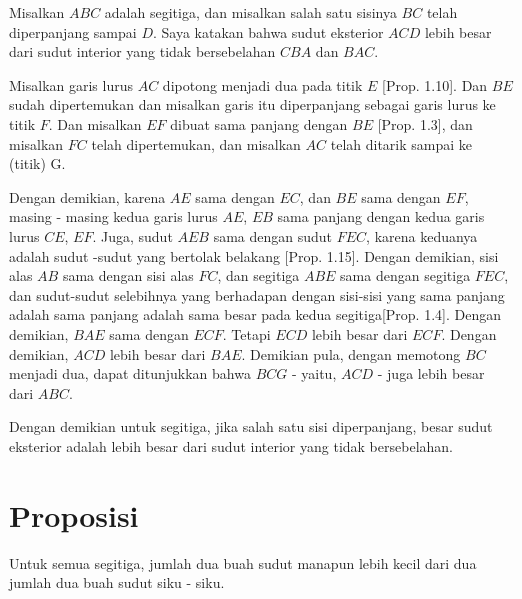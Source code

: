 \documentclass[a4paper]{book}
\begin{document}
\begin{center}
\end{center}
Misalkan $ABC$ adalah segitiga, dan misalkan salah satu sisinya $BC$ telah 
diperpanjang sampai $D$.  Saya katakan bahwa sudut eksterior $ACD$ lebih besar 
dari sudut interior yang tidak bersebelahan $CBA$ dan $BAC$.

Misalkan garis lurus $AC$ dipotong menjadi dua pada titik $E$ [Prop. 1.10]. 
Dan $BE$ sudah dipertemukan dan misalkan garis itu diperpanjang sebagai 
garis lurus ke titik $F$. 
Dan misalkan $EF$ dibuat sama panjang dengan $BE$ [Prop. 1.3], 
dan misalkan $FC$ telah dipertemukan, 
dan misalkan $AC$ telah ditarik sampai ke (titik) G.

Dengan demikian, karena $AE$ sama dengan $EC$, dan $BE$ sama dengan $EF$,
masing - masing kedua garis lurus $AE$, $EB$ sama panjang dengan kedua 
garis lurus $CE$, $EF$. Juga, sudut $AEB$ sama dengan sudut $FEC$, karena
keduanya adalah sudut -sudut yang bertolak belakang [Prop. 1.15]. 
Dengan demikian, sisi alas $AB$ sama dengan sisi alas $FC$, dan segitiga 
$ABE$ sama dengan segitiga $FEC$, dan sudut-sudut selebihnya yang berhadapan
dengan sisi-sisi yang sama panjang adalah sama panjang adalah sama besar
pada kedua segitiga[Prop. 1.4]. Dengan demikian, $BAE$ sama dengan $ECF$. 
Tetapi $ECD$ lebih besar dari $ECF$. Dengan demikian, $ACD$ lebih besar 
dari $BAE$. 
Demikian pula, dengan memotong $BC$ menjadi dua, dapat ditunjukkan 
bahwa $BCG$ - yaitu, $ACD$ - juga lebih besar dari $ABC$.  

Dengan demikian untuk segitiga, jika salah satu sisi diperpanjang, 
besar sudut eksterior adalah lebih besar dari sudut interior yang 
tidak bersebelahan.  

\section*{\centering Proposisi \thesection} 
Untuk semua segitiga, jumlah dua buah sudut manapun lebih kecil dari
dua jumlah dua buah sudut siku - siku.
\begin{center}
\end{center}
\end{document}
